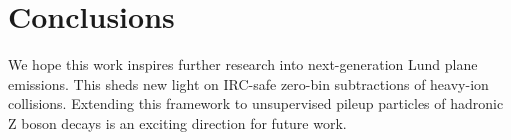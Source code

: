 \section{Conclusions}\label{sec:conclusions}

We hope this work inspires further research into next-generation Lund
plane emissions. This sheds new light on IRC-safe zero-bin subtractions
of heavy-ion collisions. Extending this framework to unsupervised pileup
particles of hadronic Z boson decays is an exciting direction for future
work.

